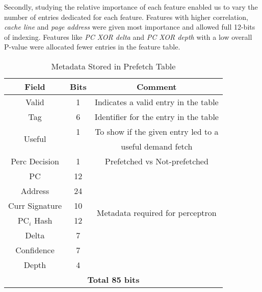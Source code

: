 Secondly, studying the relative importance of each feature enabled us
to vary the number of entries dedicated for each feature. Features
with higher correlation, \textit{cache line} and \textit{page address}
were given most importance and allowed full 12-bits of indexing.
Features like \textit{PC XOR delta} and \textit{PC XOR depth} with a
low overall P-value were allocated fewer entries in the feature table.


\begin{table}[ht]
    \centering
    \begin{adjustbox}{width=0.9\columnwidth}
    \begin{tabular}{|c|c|c|}
    \hline
        \textbf{Field} &
        \textbf{Bits} &
        \textbf{Comment} \\
    \hline
         Valid 		& 1  & Indicates a valid entry in the table\\
         Tag 		& 6  & Identifier for the entry in the table\\
         \multirow{2}{1cm}{Useful} 	& 1  & To show if the given entry led to a\\
                    	&    & useful demand fetch\\
         Perc Decision 	& 1  & Prefetched vs Not-prefetched \\
    \hline
        PC 		& 12 & \\
        Address 	& 24 & \\
        Curr Signature 	& 10 & \multirow{2}{4.8cm}{Metadata required for perceptron}\\
	PC$_i$ Hash	& 12 & \multirow{2}{1.1cm}{training}\\
        Delta 		& 7  & \\
        Confidence 	& 7  & \\
	Depth		& 4  & \\
    \hline
        \multicolumn{3}{|c|}{\textbf{Total 85 bits}}\\
    \hline
    \end{tabular}
    \end{adjustbox}
    \caption{Metadata Stored in Prefetch Table}
    \label{tab:PTable_metadata}
\end{table}


